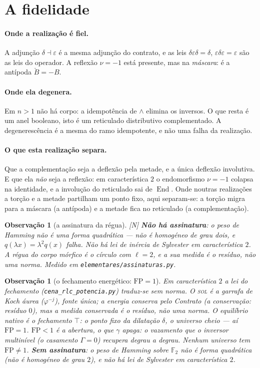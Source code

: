 \documentclass[12pt,a4paper]{article}
\newcommand{\FF}{\mathbb{F}_2}
\newcommand{\est}[1]{\textsf{\footnotesize[#1]}}
\newcommand{\code}[1]{\texttt{\footnotesize #1}}
\newtheorem{observacao}[definicao]{Observação}
\begin{document}
\section{A fidelidade}

\paragraph{Onde a realização é fiel.} A adjunção $\delta\dashv\varepsilon$ é a mesma adjunção do contrato, e as
leis $\delta\varepsilon\delta=\delta$, $\varepsilon\delta\varepsilon=\varepsilon$ são as leis do operador. A
reflexão $\nu=-1$ está presente, mas na \emph{máscara}: é a antípoda $\check B=-B$.

\paragraph{Onde ela degenera.} Em $n>1$ não há corpo: a idempotência de $\wedge$ elimina os inversos. O que resta
é um anel booleano, isto é um reticulado distributivo complementado. A degenerescência é a mesma do ramo
idempotente, e não uma falha da realização.

\paragraph{O que esta realização separa.} Que a complementação seja a deflexão pela metade, e a única deflexão
involutiva. E que ela \emph{não} seja a reflexão: em característica $2$ o endomorfismo $\nu=-1$ colapsa na
identidade, e a involução do reticulado sai de $\operatorname{End}$. Onde noutras realizações a torção e a
metade partilham um ponto fixo, aqui separam-se: a torção migra para a máscara (a antípoda) e a metade fica no
reticulado (a complementação).

\begin{observacao}[a assinatura da régua]\label{obs:assinatura}
\est{N} \textbf{Não há assinatura}: o peso de Hamming não é uma forma quadrática --- não é homogéneo de grau
dois, e $q(\lambda x)=\lambda^2q(x)$ falha. Não há lei de inércia de Sylvester em característica $2$. A régua do
corpo mórfico é o círculo com $\ell=2$, e a sua medida é o \emph{resíduo}, não uma norma.
Medido em \code{elementares/assinaturas.py}.
\end{observacao}

\begin{observacao}[o fechamento energético: $\mathrm{FP}=1$]\label{obs:fp}
Em característica $2$ a lei do fechamento (\code{cena\_rlc\_potencia.py}) traduz-se sem norma. O \textsc{sol} é a
garrafa de Koch áurea ($\varphi^{-j}$), fonte única; a energia \emph{conserva} pelo Contrato (a conservação: resíduo $0$), mas a medida conservada é o \emph{resíduo}, não uma norma. O equilíbrio nativo é o \emph{fechamento}
$\top$: o ponto fixo da dilatação $\delta$, o universo cheio --- aí $\mathrm{FP}=1$. $\mathrm{FP}<1$ é a
\emph{abertura}, o que $\gamma$ apaga: o vazamento que o inversor multinível (o casamento $\Gamma=0$) recupera
degrau a degrau. Nenhum universo tem $\mathrm{FP}\neq1$. \textbf{Sem assinatura}: o peso de Hamming sobre $\FF$
não é forma quadrática (não é homogéneo de grau $2$), e não há lei de Sylvester em característica $2$.
\end{observacao}
\end{document}
